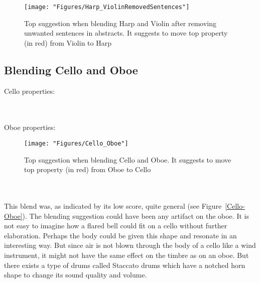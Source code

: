 \begin{figure} \centering \texttt{[image: "Figures/Harp\_ViolinRemovedSentences"]} \caption{Top suggestion when blending Harp and Violin after removing unwanted sentences in abstracts. It suggests to move top property (in red) from Violin to Harp } \label{ Harp-Violin-RemovedSentences } \end{figure}

\subsection{Blending Cello and Oboe}
Cello properties:

\noindent{}
\\\\Oboe properties:

\begin{figure} \centering \texttt{[image: "Figures/Cello\_Oboe"]} \caption{Top suggestion when blending Cello and Oboe. It suggests to move top property (in red) from Oboe to Cello } \label{ Cello-Oboe } \end{figure}

\noindent{}	
\\\\This blend was, as indicated by its low score, quite general (see Figure~\ref{Cello-Oboe}). The blending suggestion could have been any artifact on the oboe. It is not easy to imagine how a flared bell could fit on a cello without further elaboration. Perhaps the body could be given this shape and resonate in an interesting way. But since air is not blown through the body of a cello like a wind instrument, it might not have the same effect on the timbre as on an oboe. But there exists a type of drums called Staccato drums which have a notched horn shape to change its sound quality and volume.

